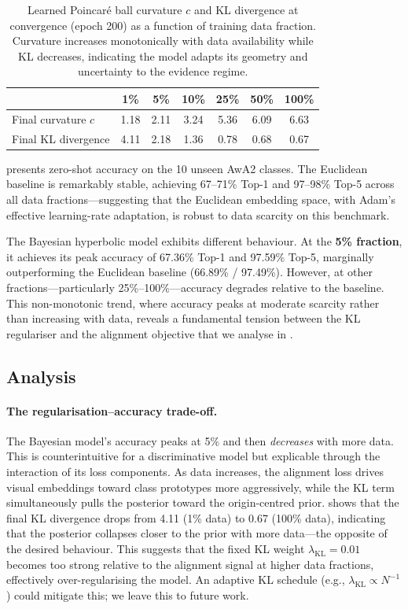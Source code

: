 \documentclass{article}
\DeclareMathOperator{\KL}{KL}
\begin{document}
\begin{table}[t]
\centering
\caption{Learned Poincar\'{e} ball curvature $c$ and KL divergence at convergence (epoch 200) as a function of training data fraction. Curvature increases monotonically with data availability while KL decreases, indicating the model adapts its geometry and uncertainty to the evidence regime.}
\label{tab:curvature}
\begin{tabular}{lcccccc}
\toprule
 & \textbf{1\%} & \textbf{5\%} & \textbf{10\%} & \textbf{25\%} & \textbf{50\%} & \textbf{100\%} \\
\midrule
Final curvature $c$ & 1.18 & 2.11 & 3.24 & 5.36 & 6.09 & 6.63 \\
Final KL divergence & 4.11 & 2.18 & 1.36 & 0.78 & 0.68 & 0.67 \\
\bottomrule
\end{tabular}
\end{table}

 presents zero-shot accuracy on the 10 unseen AwA2 classes.
The Euclidean baseline is remarkably stable, achieving 67--71\% Top-1 and 97--98\% Top-5 across all data fractions---suggesting that the Euclidean embedding space, with Adam's effective learning-rate adaptation, is robust to data scarcity on this benchmark.

The Bayesian hyperbolic model exhibits different behaviour.
At the \textbf{5\% fraction}, it achieves its peak accuracy of 67.36\% Top-1 and 97.59\% Top-5, marginally outperforming the Euclidean baseline (66.89\% / 97.49\%).
However, at other fractions---particularly 25\%--100\%---accuracy degrades relative to the baseline.
This non-monotonic trend, where accuracy peaks at moderate scarcity rather than increasing with data, reveals a fundamental tension between the KL regulariser and the alignment objective that we analyse in .

\subsection{Analysis}\label{sec:analysis}

\paragraph{The regularisation--accuracy trade-off.}
The Bayesian model's accuracy peaks at 5\% and then \emph{decreases} with more data.
This is counterintuitive for a discriminative model but explicable through the interaction of its loss components.
As data increases, the alignment loss drives visual embeddings toward class prototypes more aggressively, while the KL term simultaneously pulls the posterior toward the origin-centred prior.
 shows that the final KL divergence drops from 4.11 (1\% data) to 0.67 (100\% data), indicating that the posterior collapses closer to the prior with more data---the opposite of the desired behaviour.
This suggests that the fixed KL weight $\lambda_{\KL} = 0.01$ becomes too strong relative to the alignment signal at higher data fractions, effectively over-regularising the model.
An adaptive KL schedule (e.g., $\lambda_{\KL} \propto N^{-1}$) could mitigate this; we leave this to future work.
\end{document}
